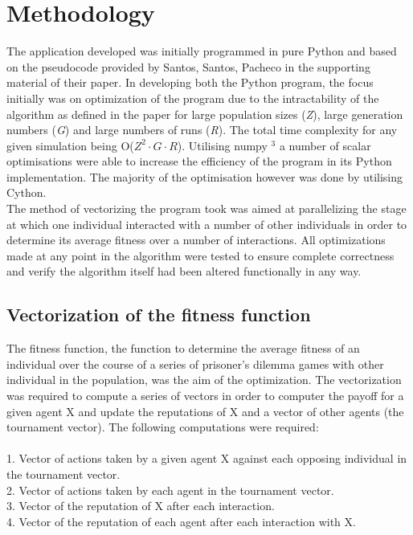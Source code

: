 \documentclass[10pt,a4paper]{article}
\begin{document}
\section{Methodology}
The application developed was initially programmed in pure Python and based on the pseudocode provided by Santos, Santos, Pacheco in the supporting material of their paper.
In developing both the Python program, the focus initially was on optimization of the program due to the intractability of the algorithm as defined in the paper for large population sizes (\emph{Z}), large generation numbers (\emph{G}) and large numbers of runs (\emph{R}).
The total time complexity for any given simulation being O(\emph{$Z^{2} \cdot G\cdot R$}).
Utilising numpy $^{3}$ a number of scalar optimisations were able to increase the efficiency of the program in its Python implementation. 
The majority of the optimisation however was done by utilising Cython.
\\
The method of vectorizing the program took was aimed at parallelizing the stage at which one individual interacted with a number of other individuals in order to determine its average fitness over a number of interactions. 
All optimizations made at any point in the algorithm were tested to ensure complete correctness and verify the algorithm itself had been altered functionally in any way.
\\
\subsection{Vectorization of the fitness function}
The fitness function, the function to determine the average fitness of an individual over the course of a series of prisoner's dilemma games with other individual in the population, was the aim of the optimization. 
The vectorization was required to compute a series of vectors in order to computer the payoff for a given agent X and update the reputations of X and a vector of other agents (the tournament vector).
The following computations were required:
\\
\\ 1. Vector of actions taken by a given agent X against each opposing individual in the tournament vector.
\\ 2. Vector of actions taken by each agent in the tournament vector.
\\ 3. Vector of the reputation of X after each interaction.
\\ 4. Vector of the reputation of each agent after each interaction with X. \\\\
\end{document}
